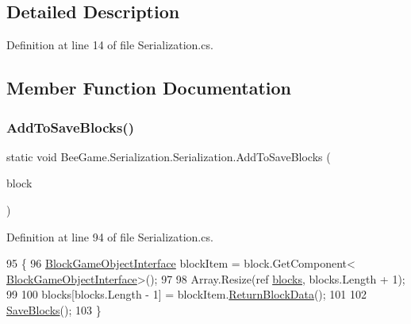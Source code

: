 \subsection{Detailed Description}


Definition at line 14 of file Serialization.\+cs.



\subsection{Member Function Documentation}
\mbox{\label{class_bee_game_1_1_serialization_1_1_serialization_a1cc1b4dcf2acafaa063b5fde22a0dd41}} 
\subsubsection{\texorpdfstring{Add\+To\+Save\+Blocks()}{AddToSaveBlocks()}}
{\footnotesize\ttfamily static void Bee\+Game.\+Serialization.\+Serialization.\+Add\+To\+Save\+Blocks (\begin{DoxyParamCaption}\item[{Game\+Object}]{block }\end{DoxyParamCaption})\hspace{0.3cm}{\ttfamily [static]}}



Definition at line 94 of file Serialization.\+cs.


\begin{DoxyCode}
95         \{
96             \hyperlink{class_bee_game_1_1_blocks_1_1_block_game_object_interface}{BlockGameObjectInterface} blockItem = block.GetComponent<
      \hyperlink{class_bee_game_1_1_blocks_1_1_block_game_object_interface}{BlockGameObjectInterface}>();
97             
98             Array.Resize(ref \hyperlink{class_bee_game_1_1_serialization_1_1_serialization_a0b8dee0f221f22b34bb3de8c146b4d0d}{blocks}, blocks.Length + 1);
99 
100             blocks[blocks.Length - 1] = blockItem.\hyperlink{class_bee_game_1_1_blocks_1_1_block_game_object_interface_a40b044d5bf2a857ea25796685e23f768}{ReturnBlockData}();
101 
102             \hyperlink{class_bee_game_1_1_serialization_1_1_serialization_af90f749946423cc375c37bd7d496691a}{SaveBlocks}();
103         \}
\end{DoxyCode}
\mbox{\label{class_bee_game_1_1_serialization_1_1_serialization_afefd28e9eab4d1ce6c61ed03b724902d}} 
